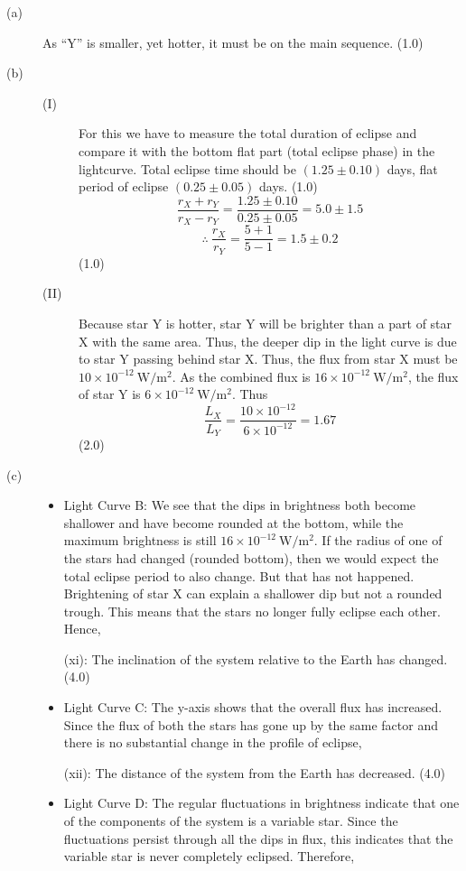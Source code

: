 \begin{description}
\item[(a)] As ``Y'' is smaller, yet hotter, it must be on the main sequence.
  \hfill(1.0)
\item[(b)]
  \begin{description}
  \item[(I)] For this we have to measure the total duration of eclipse and
    compare it with the bottom flat part (total eclipse phase) in the
    lightcurve. Total eclipse time should be $(1.25 \pm 0.10)$ days, flat
    period of eclipse $(0.25 \pm 0.05)$ days. \hfill(1.0)
    \[ \frac{r_X + r_Y}{r_X - r_Y} = \frac{1.25 \pm 0.10}{0.25 \pm 0.05}
       = 5.0 \pm 1.5 \]
    \[ \therefore\ \frac{r_X}{r_Y} = \frac{5 + 1}{5 - 1} = 1.5 \pm 0.2 \]
    \hfill(1.0)
  \item[(II)] Because star Y is hotter, star Y will be brighter than a part
    of star X with the same area. Thus, the deeper dip in the light curve is
    due to star Y passing behind star X. Thus, the flux from star X must be
    $10 \times 10^{-12}\ \mathrm{W/m^2}$. As the combined flux is
    $16 \times 10^{-12}\ \mathrm{W/m^2}$, the flux of star Y is
    $6 \times 10^{-12}\ \mathrm{W/m^2}$. Thus
    \[ \frac{L_X}{L_Y} = \frac{10 \times 10^{-12}}{6 \times 10^{-12}}
       = 1.67 \]
    \hfill(2.0)
  \end{description}
\item[(c)]
  \begin{itemize}
  \item Light Curve B: We see that the dips in brightness both become
    shallower and have become rounded at the bottom, while the maximum
    brightness is still $16 \times 10^{-12}\ \mathrm{W/m^2}$. If the radius
    of one of the stars had changed (rounded bottom), then we would expect
    the total eclipse period to also change. But that has not happened.
    Brightening of star X can explain a shallower dip but not a rounded
    trough. This means that the stars no longer fully eclipse each other.
    Hence,

    (xi): The inclination of the system relative to the Earth has changed.
    \hfill(4.0)
  \item Light Curve C: The y-axis shows that the overall flux has increased.
    Since the flux of both the stars has gone up by the same factor and there
    is no substantial change in the profile of eclipse,

    (xii): The distance of the system from the Earth has decreased.
    \hfill(4.0)
  \item Light Curve D: The regular fluctuations in brightness indicate that
    one of the components of the system is a variable star. Since the
    fluctuations persist through all the dips in flux, this indicates that
    the variable star is never completely eclipsed. Therefore,


\end{itemize}
\end{description}
